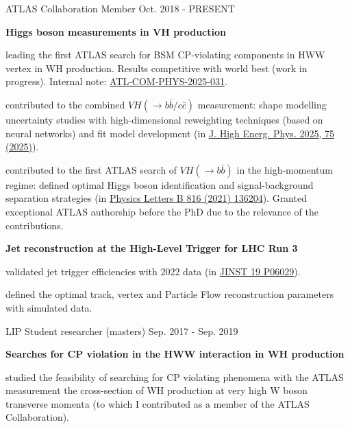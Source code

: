 \begin{cventries}
    \cventry
    {ATLAS Collaboration}
    {Member}
    {}
    {Oct. 2018 - PRESENT}
    {
        \textbf{Higgs boson measurements in VH production}\vspace{14pt}
        \begin{cvitems}
            \item {leading the first ATLAS search for BSM CP-violating components in HWW vertex in WH production. Results competitive with world best (work in progress). Internal note: \href{https://cds.cern.ch/record/2921718}{ATL-COM-PHYS-2025-031}.}
            \item {contributed to the combined $VH(\to b\bar{b}/c\bar{c})$ measurement: shape modelling uncertainty studies with high-dimensional reweighting techniques (based on neural networks) and fit model development (in \href{https://doi.org/10.1007/JHEP04(2025)075}{J. High Energ. Phys. 2025, 75 (2025)}).}
            \item {contributed to the first ATLAS search of $VH(\to b\bar{b})$ in the high-momentum regime: defined optimal Higgs boson identification and signal-background separation strategies (in \href{https://doi.org/10.1016/j.physletb.2021.136204}{Physics Letters B 816 (2021) 136204}). Granted exceptional ATLAS authorship before the PhD due to the relevance of the contributions.}
        \end{cvitems}\vspace{19pt}
        \textbf{Jet reconstruction at the High-Level Trigger for LHC Run 3}\vspace{14pt}
        \begin{cvitems}
            \item {validated jet trigger efficiencies with 2022 data (in \href{https://doi.org/10.1088/1748-0221/19/06/P06029}{JINST 19 P06029}).}
            \item {defined the optimal track, vertex and Particle Flow reconstruction parameters with simulated data.}
        \end{cvitems}
    }

    \cventry
    {LIP}
    {Student researcher (masters)}
    {}
    {Sep. 2017 - Sep. 2019}
    {
        \textbf{Searches for CP violation in the HWW interaction in WH production}\vspace{12pt}
        \begin{cvitems}      
            \item {studied the feasibility of searching for CP violating phenomena with the ATLAS measurement the cross-section of WH production at very high W boson transverse momenta (to which I contributed as a member of the ATLAS Collaboration).}
        \end{cvitems}
    }

\end{cventries}
